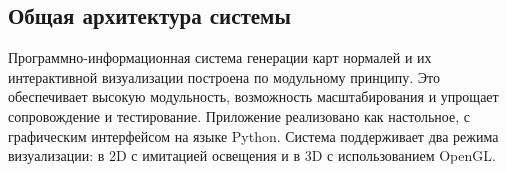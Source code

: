 \begin{comment}
\subsubsection{Pillow}

Pillow — библиотека для загрузки и сохранения изображений. Для работы с форматами изображений (PNG, JPG и др.) используется библиотека Pillow, являющаяся модернизированной и расширенной версией PIL (Python Imaging Library). Она позволяет:
\begin{enumerate}
	\item Загружать изображения из файлов.
	\item Конвертировать изображения между различными цветовыми пространствами.
	\item Сохранять результаты генерации нормалей в различных форматах.
	\item Извлекать метаинформацию об изображениях.
\end{enumerate}

OpenGL — библиотека для трёхмерной графики и визуализации.
С использованием OpenGL реализованы следующие возможности:
\begin{enumerate}
	\item Создание 3D-сцены с кубом, каждая грань которого текстурирована загруженным изображением.
	\item Назначение карты нормалей в качестве источника данных для расчёта взаимодействия поверхности с направленным освещением.
	\item Обработка пользовательского ввода (вращение, масштабирование сцены).
	\item Моделирование поведения направленного источника света и реалистичного освещения с учётом нормалей.
\end{enumerate}

Для отображения визуального эффекта освещения по нормалям применяется рендеринг на холст с использованием комбинации данных карты нормалей и положения мыши. Алгоритм реализован вручную с использованием NumPy и PyQt5, без сторонних движков визуализации, что обеспечивает наглядность и полный контроль над процессом.
\end{comment}
\subsection{Общая архитектура системы}

Программно-информационная система генерации карт нормалей и их интерактивной визуализации построена по модульному принципу. Это обеспечивает высокую модульность, возможность масштабирования и упрощает сопровождение и тестирование. Приложение реализовано как настольное, с графическим интерфейсом на языке Python. Система поддерживает два режима визуализации: в 2D с имитацией освещения и в 3D с использованием OpenGL.

